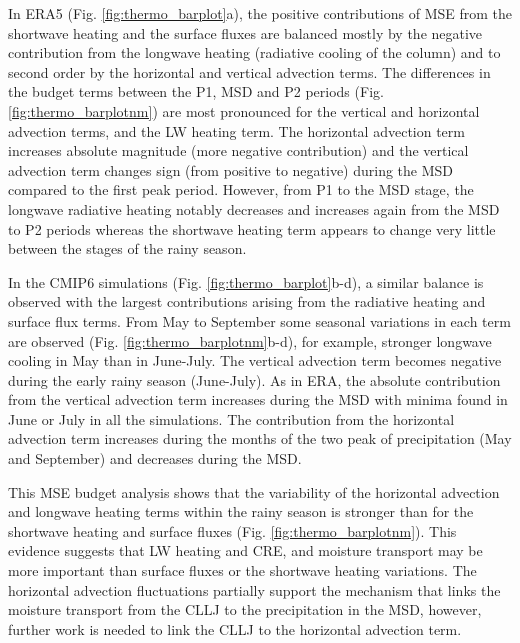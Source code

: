 In ERA5 (Fig. \ref{fig:thermo_barplot}a), the positive contributions of MSE from the shortwave heating and the surface fluxes are balanced mostly by the negative contribution from the longwave heating (radiative cooling of the column)  and to second order by the horizontal and vertical advection terms. 
The differences in the budget terms between the P1, MSD and P2 periods (Fig. \ref{fig:thermo_barplotnm}) are most pronounced for the vertical and horizontal advection terms, and the LW heating term. The horizontal advection term increases absolute magnitude (more negative contribution) and the vertical advection term changes sign (from positive to negative) during the MSD compared to the first peak period. However, from P1 to the MSD stage, the longwave radiative heating notably decreases and increases again from the MSD to P2 periods whereas the shortwave heating term appears to change very little between the stages of the rainy season.

In the CMIP6 simulations (Fig. \ref{fig:thermo_barplot}b-d), a similar balance is observed with the largest contributions arising from the radiative heating and surface flux terms. 
From May to September some seasonal variations in each term are observed (Fig. \ref{fig:thermo_barplotnm}b-d), for example, stronger longwave cooling in May than in June-July. The vertical advection term becomes negative during the early rainy season (June-July). As in ERA, the absolute contribution from the vertical advection term increases during the MSD with minima found in June or July in all the simulations. 
The contribution from the horizontal advection term increases during the months of the two peak of precipitation (May and September) and decreases during the MSD. 

This MSE budget analysis shows that the variability of the horizontal advection and longwave heating terms within the rainy season is stronger than for the shortwave heating and surface fluxes (Fig. \ref{fig:thermo_barplotnm}). 
This evidence suggests that LW heating and CRE, and moisture transport may be more important than surface fluxes or the shortwave heating variations. 
The horizontal advection fluctuations partially support the mechanism that links the moisture transport from the CLLJ to the precipitation in the MSD, however, further work is needed to link the CLLJ to the horizontal advection term. %

